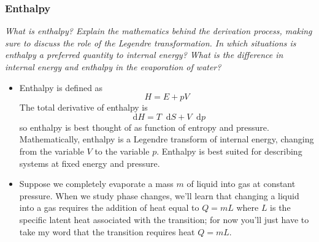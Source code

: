 \documentclass[11pt, a4paper]{article}
\newcommand{\diff}{\mathop{}\!\mathrm{d}} %
\begin{document}
\subsubsection{Enthalpy}
\textit{What is enthalpy? Explain the mathematics behind the derivation process, making sure to discuss the role of the Legendre transformation. In which situations is enthalpy a preferred quantity to internal energy? What is the difference in internal energy and enthalpy in the evaporation of water?}
\begin{itemize}
	\item Enthalpy is defined as
	\begin{equation*}
		H = E + p V
	\end{equation*}
	The total derivative of enthalpy is 
	\begin{equation*}
		\diff H = T \diff S + V \diff p
	\end{equation*}
	so enthalpy is best thought of as function of entropy and pressure. Mathematically, enthalpy is a Legendre transform of internal energy, changing from the variable $ V $ to the variable $ p $. Enthalpy is best suited for describing systems at fixed energy and pressure.
	
	\item Suppose we completely evaporate a mass $ m $ of liquid into gas at constant pressure. When we study phase changes, we'll learn that changing a liquid into a gas requires the addition of heat equal to $ Q = mL $ where $ L $ is the specific latent heat associated with the transition; for now you'll just have to take my word that the transition requires heat $ Q = mL $. 
	

\end{itemize}
\end{document}
